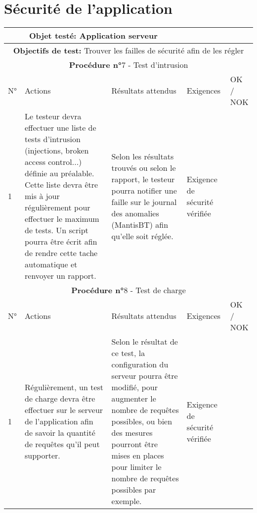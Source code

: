 \section*{Sécurité de l'application}
\begin{table}[!h]
        \centering
        \begin{tabular}{|m{0.6cm}|
                         >{\raggedright\arraybackslash}m{4cm}|
                         >{\raggedright\arraybackslash}m{6.4cm}|
                         >{\raggedright\arraybackslash}m{2cm}|
                         m{1cm}|}
            \hline
            \multicolumn{3}{|c|}{
                \textbf{Objet testé: } Application serveur
            } & \multicolumn{2}{|c|}{
                \textbf{Version: } version    
            } \\
            \hline
            \multicolumn{5}{|c|}{\textbf{Objectifs de test:} 
                Trouver les failles de sécurité afin de les régler} \\
            \hline
            \multicolumn{5}{|c|}{
                \textbf{Procédure n°}7 - Test d'intrusion
            } \\
            \hline
            N° & Actions & Résultats attendus & Exigences & OK / NOK \\
            \hline      %
            1 & Le testeur devra effectuer une liste de tests d'intrusion
                (injections, broken access control...) définie au préalable.
                Cette liste devra être mis à jour régulièrement pour effectuer
                le maximum de tests. Un script pourra être écrit afin de rendre
                cette tache automatique et renvoyer un rapport.
              & Selon les résultats trouvés ou selon le rapport, le testeur pourra
                notifier une faille sur le journal des anomalies (MantisBT) afin
                qu'elle soit réglée.
              & Exigence de sécurité vérifiée & \\
            \hline
            \multicolumn{5}{|c|}{
                \textbf{Procédure n°}8 - Test de charge
            } \\
            \hline
            N° & Actions & Résultats attendus & Exigences & OK / NOK \\
            \hline      %
            1 & Régulièrement, un test de charge devra être effectuer sur
                le serveur de l'application afin de savoir la quantité de
                requêtes qu'il peut supporter.
              & Selon le résultat de ce test, la configuration du serveur
                pourra être modifié, pour augmenter le nombre de requêtes
                possibles, ou bien des mesures pourront être mises en
                places pour limiter le nombre de requêtes possibles par
                exemple.
              & Exigence de sécurité vérifiée & \\
            \hline
        \end{tabular} 
        \label{tab:tab6}
\end{table}
\newpage

